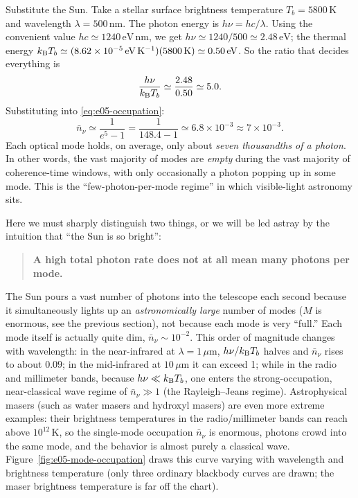 Substitute the Sun. Take a stellar surface brightness temperature \(T_b=5800\,\mathrm{K}\) and wavelength \(\lambda=500\,\mathrm{nm}\). The photon energy is \(h\nu=hc/\lambda\). Using the convenient value \(hc\simeq1240\,\mathrm{eV\,nm}\), we get \(h\nu\simeq1240/500\simeq2.48\,\mathrm{eV}\); the thermal energy \(k_{\rm B}T_b\simeq(8.62\times10^{-5}\,\mathrm{eV\,K^{-1}})(5800\,\mathrm{K})\simeq0.50\,\mathrm{eV}\). So the ratio that decides everything is
\[
  \frac{h\nu}{k_{\rm B}T_b}\simeq\frac{2.48}{0.50}\simeq5.0 .
\]
Substituting into \eqref{eq:e05-occupation}:
\[
  \bar n_\nu\simeq\frac1{e^{5}-1}=\frac1{148.4-1}\simeq6.8\times10^{-3}
  \approx7\times10^{-3}.
\]
Each optical mode holds, on average, only about \emph{seven thousandths of a photon}. In other words, the vast majority of modes are \emph{empty} during the vast majority of coherence-time windows, with only occasionally a photon popping up in some mode. This is the ``few-photon-per-mode regime'' in which visible-light astronomy sits.

Here we must sharply distinguish two things, or we will be led astray by the intuition that ``the Sun is so bright'':

\begin{quote}
\textbf{A high total photon rate does not at all mean many photons per mode.}
\end{quote}

The Sun pours a vast number of photons into the telescope each second because it simultaneously lights up an \emph{astronomically large} number of modes (\(M\) is enormous, see the previous section), not because each mode is very ``full.'' Each mode itself is actually quite dim, \(\bar n_\nu\sim10^{-2}\). This order of magnitude changes with wavelength: in the near-infrared at \(\lambda=1\,\mu\mathrm{m}\), \(h\nu/k_{\rm B}T_b\) halves and \(\bar n_\nu\) rises to about \(0.09\); in the mid-infrared at \(10\,\mu\mathrm{m}\) it can exceed 1; while in the radio and millimeter bands, because \(h\nu\ll k_{\rm B}T_b\), one enters the strong-occupation, near-classical wave regime of \(\bar n_\nu\gg1\) (the Rayleigh--Jeans regime). Astrophysical masers (such as water masers and hydroxyl masers) are even more extreme examples: their brightness temperatures in the radio/millimeter bands can reach above \(10^{12}\)\,K, so the single-mode occupation \(\bar n_\nu\) is enormous, photons crowd into the same mode, and the behavior is almost purely a classical wave. Figure~\ref{fig:e05-mode-occupation} draws this curve varying with wavelength and brightness temperature (only three ordinary blackbody curves are drawn; the maser brightness temperature is far off the chart).

